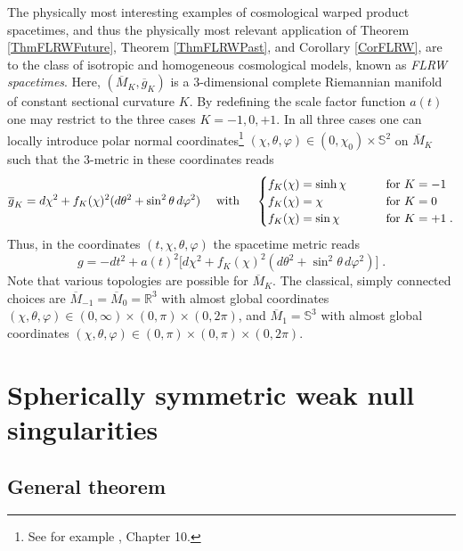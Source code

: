 \documentclass[reqno]{article}
\newcommand{\R}{\mathbb{R}}
\begin{document}
The physically most interesting examples of cosmological warped product spacetimes, and thus the physically most relevant application of Theorem \ref{ThmFLRWFuture}, Theorem \ref{ThmFLRWPast}, and Corollary \ref{CorFLRW}, are to the class of isotropic and homogeneous cosmological models, known as \emph{FLRW spacetimes}. Here, $(\overline{M}_K, \overline{g}_K)$ is a $3$-dimensional complete Riemannian manifold of constant sectional curvature $K$. 
By redefining the scale factor function $a(t)$ one may restrict to the three cases $K = -1, 0, +1$. In all three cases one can locally introduce polar normal coordinates\footnote{See for example \cite{LeeRiem}, Chapter 10.} $(\chi, \theta, \varphi) \in (0,\chi_0) \times \mathbb{S}^2$ on $\overline{M}_K$ such that the $3$-metric in these coordinates reads $$\overline{g}_K = d\chi^2 + f_K(\chi)^2(d\theta^2 + \sin^2\theta \, d\varphi^2) \quad \textnormal{ with }\quad  \begin{cases} f_K(\chi) = \sinh \chi \qquad &\textnormal{ for } K = -1 \\
f_K(\chi) = \chi &\textnormal{ for } K = 0 \\
f_K(\chi) = \sin \chi &\textnormal{ for } K = +1 \;. \end{cases}$$
Thus, in the coordinates $(t,\chi,\theta, \varphi)$ the spacetime metric reads
$$g  = -dt^2 + a(t)^2\big[ d\chi^2 + f_K(\chi)^2(d\theta^2 + \sin^2\theta \, d\varphi^2)\big]\;.$$
Note that various topologies are possible for $\overline{M}_K$. The classical, simply connected choices are $\overline{M}_{-1} = \overline{M}_0 = \R^3$ with almost global coordinates $(\chi, \theta, \varphi) \in (0,\infty) \times (0,\pi) \times (0,2\pi)$, and  $\overline{M}_1 = \mathbb{S}^3$ with almost global coordinates $(\chi, \theta, \varphi) \in (0,\pi) \times (0,\pi) \times (0,2\pi)$. 

















\section{Spherically symmetric weak null singularities}

\subsection{General theorem} \label{SecGT}
\end{document}
